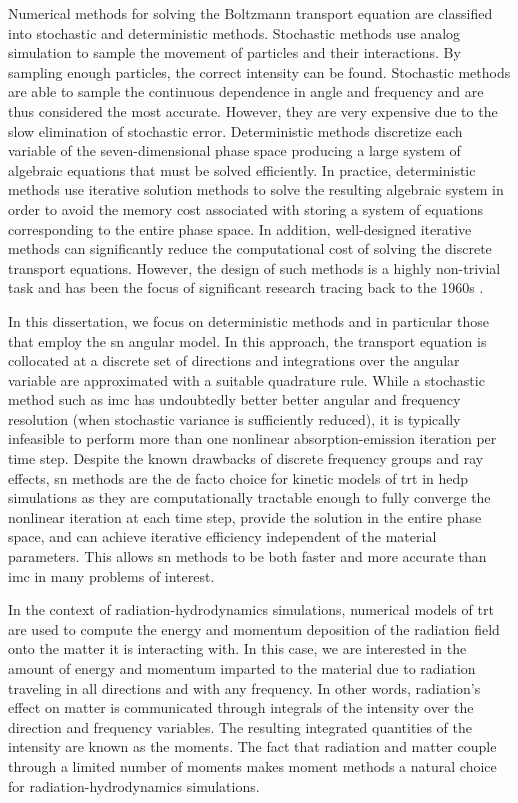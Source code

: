 \documentclass[../doc.tex]{subfiles}
\begin{document}
Numerical methods for solving the Boltzmann transport equation are classified into stochastic and deterministic methods. Stochastic methods use analog simulation to sample the movement of particles and their interactions. By sampling enough particles, the correct intensity can be found. Stochastic methods are able to sample the continuous dependence in angle and frequency and are thus considered the most accurate. 
However, they are very expensive due to the slow elimination of stochastic error.
Deterministic methods discretize each variable of the seven-dimensional phase space producing a large system of algebraic equations that must be solved efficiently. In practice, deterministic methods use iterative solution methods to solve the resulting algebraic system in order to avoid the memory cost associated with storing a system of equations corresponding to the entire phase space. In addition, well-designed iterative methods can significantly reduce the computational cost of solving the discrete transport equations. However, the design of such methods is a highly non-trivial task and has been the focus of significant research tracing back to the 1960s \cite{AL}. 

In this dissertation, we focus on deterministic methods and in particular those that employ the \gls{sn} angular model. In this approach, the transport equation is collocated at a discrete set of directions and integrations over the angular variable are approximated with a suitable quadrature rule. 
While a stochastic method such as \gls{imc} \cite{2001JCoPh.172..543G} has undoubtedly better better angular and frequency resolution (when stochastic variance is sufficiently reduced), it is typically infeasible to perform more than one nonlinear absorption-emission iteration per time step. Despite the known drawbacks of discrete frequency groups and ray effects, \gls{sn} methods are the de facto choice for kinetic models of \gls{trt} in \gls{hedp} simulations as they are computationally tractable enough to fully converge the nonlinear iteration at each time step, provide the solution in the entire phase space, and can achieve iterative efficiency independent of the material parameters. This allows \gls{sn} methods to be both faster and more accurate than \gls{imc} in many problems of interest. 

In the context of radiation-hydrodynamics simulations, numerical models of \gls{trt} are used to compute the energy and momentum deposition of the radiation field onto the matter it is interacting with. In this case, we are interested in the amount of energy and momentum imparted to the material due to radiation traveling in all directions and with any frequency. In other words, radiation's effect on matter is communicated through integrals of the intensity over the direction and frequency variables. The resulting integrated quantities of the intensity are known as the moments. The fact that radiation and matter couple through a limited number of moments makes moment methods a natural choice for radiation-hydrodynamics simulations. 
\end{document}
